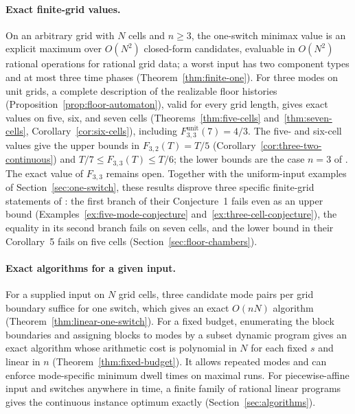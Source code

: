 \paragraph{Exact finite-grid values.}
On an arbitrary grid with $N$ cells and $n\ge3$, the one-switch minimax value
is an explicit maximum over $O(N^2)$ closed-form candidates, evaluable in
$O(N^2)$ rational operations for rational grid data; a worst input has two
component types and at most three time phases
(Theorem~\ref{thm:finite-one}). For three modes on
unit grids, a complete description of the realizable floor histories
(Proposition~\ref{prop:floor-automaton}), valid for every grid length, gives
exact values on five, six, and seven cells
(Theorems~\ref{thm:five-cells} and~\ref{thm:seven-cells},
Corollary~\ref{cor:six-cells}), including
$F^{\mathrm{unit}}_{3,3}(7)=4/3$. The five- and six-cell values give the
upper bounds in $F_{3,2}(T)=T/5$ (Corollary~\ref{cor:three-two-continuous})
and $T/7\le F_{3,3}(T)\le T/6$; the lower bounds are the case $n=3$ of
\cite[Proposition~4]{sager-zeile2021}. The exact value of $F_{3,3}$ remains
open. Together with the uniform-input examples of
Section~\ref{sec:one-switch}, these results disprove three specific
finite-grid statements of \citet{sager-zeile2021}: the first branch of their
Conjecture~1 fails even as an upper bound
(Examples~\ref{ex:five-mode-conjecture} and~\ref{ex:three-cell-conjecture}),
the equality in its second branch fails on seven cells, and the lower bound
in their Corollary~5 fails on five cells
(Section~\ref{sec:floor-chambers}).

\paragraph{Exact algorithms for a given input.}
For a supplied input on $N$ grid cells, three candidate mode pairs per grid
boundary suffice for one switch, which gives an exact $O(nN)$ algorithm
(Theorem~\ref{thm:linear-one-switch}). For a fixed budget, enumerating the
block boundaries and assigning blocks to modes by a subset dynamic program
gives an exact algorithm whose arithmetic cost is polynomial in $N$ for each
fixed $s$ and linear in $n$ (Theorem~\ref{thm:fixed-budget}). It allows
repeated modes and can enforce mode-specific minimum dwell times on maximal
runs. For piecewise-affine input and switches anywhere in time, a finite
family of rational linear programs gives the continuous instance optimum
exactly (Section~\ref{sec:algorithms}).

